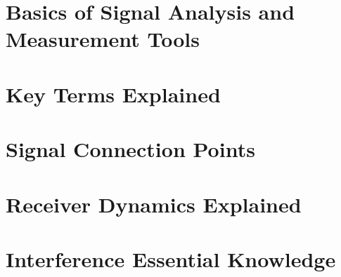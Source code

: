 \documentclass[12pt]{book}
\begin{document}
\section{Basics of Signal Analysis and Measurement Tools}











\section{Key Terms Explained}











\section{Signal Connection Points}














\section{Receiver Dynamics Explained}














\section{Interference Essential Knowledge}














\end{document}
